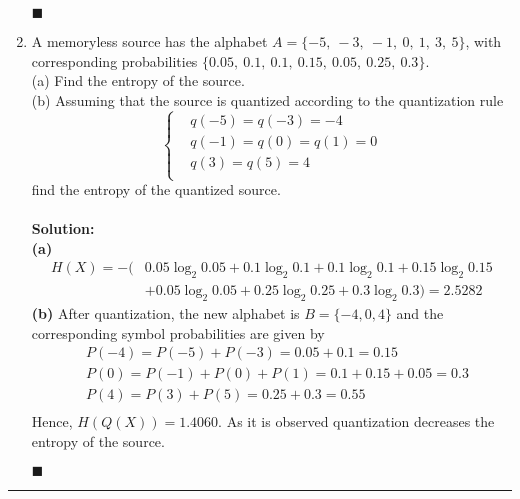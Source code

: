 \documentclass[a4paper,12pt]{article}
\begin{document}
\begin{enumerate}
            \begin{flushright}
                $\blacksquare$
            \end{flushright}
        \item 
            A memoryless source has the alphabet $A = \{-5, \ -3, \ -1, \ 0, \ 1, \ 3, \ 5 \}$, with corresponding probabilities $\{ 0.05, \ 0.1, \ 0.1, \ 0.15, \ 0.05, \ 0.25, \ 0.3 \}$. \\ 
            (a) Find the entropy of the source. \\ 
            (b) Assuming that the source is quantized according to the quantization rule
            $$\left\{ 
            \begin{aligned}
                & q(-5) = q(-3) = -4 \\
                & q(-1) = q(0) = q(1) = 0 \\ 
                & q(3) = q(5) = 4 \\
            \end{aligned}
            \right.
            $$ 
            find the entropy of the quantized source. \\ \\
            \textbf{Solution:} \\
            \textbf{(a)} 
            \begin{align*}
                H(X) = -( & 0.05 \log_2 0.05 + 0.1 \log_2 0.1 + 0.1 \log_2 0.1 + 0.15 \log_2 0.15 \\ & + 0.05 \log_2 0.05 + 0.25 \log_2 0.25 + 0.3 \log_2 0.3) = 2.5282
            \end{align*}
            \textbf{(b)} 
            After quantization, the new alphabet is $B = \{ -4, 0, 4 \}$ and the corresponding symbol probabilities are given by
            $$ 
            \begin{aligned}
                & P(-4) = P(-5) + P(-3) = 0.05 + 0.1 = 0.15 \\
                & P(0) = P(-1) + P(0) + P(1) = 0.1 + 0.15 + 0.05 = 0.3 \\ 
                & P(4) = P(3) + P(5) = 0.25 + 0.3 = 0.55 \\
            \end{aligned}
            $$
            Hence, $H(Q(X)) = 1.4060$. As it is observed quantization decreases the entropy of the source.
            \begin{flushright}
                $\blacksquare$
            \end{flushright}
    \end{enumerate}
    \rule{\textwidth}{0.4pt}
\end{document}
